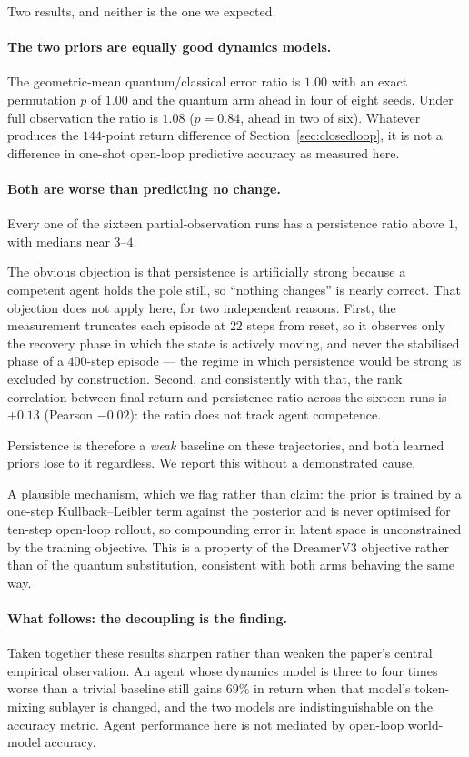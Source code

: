 \documentclass[11pt,onecolumn]{article}
\begin{document}
Two results, and neither is the one we expected.

\paragraph{The two priors are equally good dynamics models.}
The geometric-mean quantum/classical error ratio is $1.00$ with an exact
permutation $p$ of $1.00$ and the quantum arm ahead in four of eight
seeds. Under full observation the ratio is $1.08$ ($p = 0.84$, ahead in
two of six). Whatever produces the $144$-point return difference of
Section~\ref{sec:closedloop}, it is not a difference in one-shot
open-loop predictive accuracy as measured here.

\paragraph{Both are worse than predicting no change.}
Every one of the sixteen partial-observation runs has a
persistence ratio above $1$, with medians near $3$--$4$.

The obvious objection is that persistence is artificially strong because
a competent agent holds the pole still, so ``nothing changes'' is nearly
correct. That objection does not apply here, for two independent
reasons. First, the measurement truncates each episode at $22$ steps
from reset, so it observes only the recovery phase in which the state is
actively moving, and never the stabilised phase of a $400$-step
episode --- the regime in which persistence would be strong is excluded
by construction. Second, and consistently with that, the rank
correlation between final return and persistence ratio across the
sixteen runs is $+0.13$ (Pearson $-0.02$): the ratio does not track
agent competence.

Persistence is therefore a \emph{weak} baseline on these trajectories,
and both learned priors lose to it regardless. We report this without a
demonstrated cause.

A plausible mechanism, which we flag rather than claim: the prior is
trained by a one-step Kullback--Leibler term against the posterior and
is never optimised for ten-step open-loop rollout, so compounding error
in latent space is unconstrained by the training objective. This is a
property of the DreamerV3 objective rather than of the quantum
substitution, consistent with both arms behaving the same way.

\paragraph{What follows: the decoupling is the finding.}
Taken together these results sharpen rather than weaken the paper's
central empirical observation. An agent whose dynamics model is
three to four times worse than a trivial baseline still gains $69\%$ in
return when that model's token-mixing sublayer is changed, and the two
models are indistinguishable on the accuracy metric. Agent performance
here is not mediated by open-loop world-model accuracy.
\end{document}

